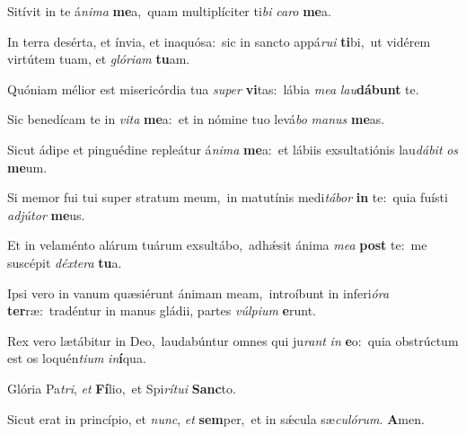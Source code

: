Sitívit in te á\textit{ni}\textit{ma} \textbf{me}a,~\redgreheightstar quam multiplíciter ti\textit{bi} \textit{ca}\textit{ro} \textbf{me}a.

In terra desérta, et ínvia, et inaquósa:~\reddagger sic in sancto appá\textit{ru}\textit{i} \textbf{ti}bi,~\redgreheightstar ut vidérem virtútem tuam, et \textit{gló}\textit{ri}\textit{am} \textbf{tu}am.

Quóniam mélior est misericórdia tua \textit{su}\textit{per} \textbf{vi}tas:~\redgreheightstar lábia \textit{me}\textit{a} \textit{lau}\textbf{dá}\textbf{bunt} te.

Sic benedícam te in \textit{vi}\textit{ta} \textbf{me}a:~\redgreheightstar et in nómine tuo levá\textit{bo} \textit{ma}\textit{nus} \textbf{me}as.

Sicut ádipe et pinguédine repleátur á\textit{ni}\textit{ma} \textbf{me}a:~\redgreheightstar et lábiis exsultatiónis lau\textit{dá}\textit{bit} \textit{os} \textbf{me}um.

Si memor fui tui super stratum meum,~\reddagger in matutínis medi\textit{tá}\textit{bor} \textbf{in} te:~\redgreheightstar quia fuísti \textit{ad}\textit{jú}\textit{tor} \textbf{me}us.

Et in velaménto alárum tuárum exsultábo,~\reddagger adhǽsit ánima \textit{me}\textit{a} \textbf{post} te:~\redgreheightstar me suscépit \textit{déx}\textit{te}\textit{ra} \textbf{tu}a.

Ipsi vero in vanum quæsiérunt ánimam meam,~\reddagger introíbunt in inferi\textit{ó}\textit{ra} \textbf{ter}ræ:~\redgreheightstar tradéntur in manus gládii, partes \textit{vúl}\textit{pi}\textit{um} \textbf{e}runt.

Rex vero lætábitur in Deo,~\reddagger laudabúntur omnes qui ju\textit{rant} \textit{in} \textbf{e}o:~\redgreheightstar quia obstrúctum est os loquén\textit{ti}\textit{um} \textit{in}\textbf{í}qua.

Glória Pa\textit{tri}, \textit{et} \textbf{Fí}lio,~\redgreheightstar et Spi\textit{rí}\textit{tu}\textit{i} \textbf{Sanc}to.

Sicut erat in princípio, et \textit{nunc}, \textit{et} \textbf{sem}per,~\redgreheightstar et in sǽcula sæ\textit{cu}\textit{ló}\textit{rum}. \textbf{A}men.

